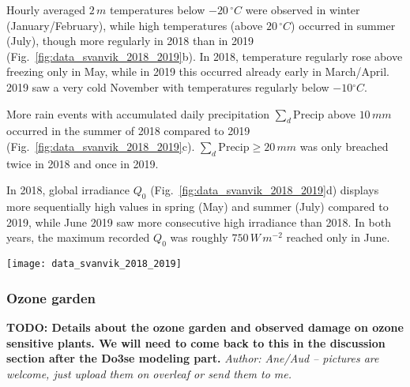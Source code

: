 \documentclass[bg, manuscript]{copernicus}
\begin{document}
Hourly averaged $2\,\unit{m}$ temperatures below $-20\,\unit{^\circ C}$ were observed in winter (January/February), while high temperatures (above $20\,\unit{^\circ C}$) occurred in summer (July), though more regularly in 2018 than in 2019 (Fig.~\ref{fig:data_svanvik_2018_2019}b). In 2018, temperature regularly rose above freezing only in May, while in 2019 this occurred already early in March/April. 2019 saw a very cold November with temperatures regularly below $-10\unit{^\circ C}$.

More rain events with accumulated daily precipitation $\sum_d \mathrm{Precip}$ above $10\,\unit{mm}$ occurred in the summer of 2018 compared to 2019 (Fig.~\ref{fig:data_svanvik_2018_2019}c). $\sum_d \mathrm{Precip} \ge 20\,\unit{mm}$ was only breached twice in 2018 and once in 2019.

In 2018, global irradiance $Q_0$ (Fig.~\ref{fig:data_svanvik_2018_2019}d) displays more sequentially high values in spring (May) and summer (July) compared to 2019, while June 2019 saw more consecutive high irradiance than 2018. In both years, the maximum recorded $Q_0$ was roughly $750\,\unit{W\,m^{-2}}$ reached only in June.

\begin{figure*}[t]
  \texttt{[image: data\_svanvik\_2018\_2019]}
  \caption{Observational data from atmospheric monitoring at Svanhovd in 2018/19. The hatched areas indicate missing ozone monitoring data. (a) Hourly averaged ozone concentration; (b) hourly averaged temperature; (c) daily accumulated precipitation; (d) hourly averaged global irradiance.}
  \label{fig:data_svanvik_2018_2019}
\end{figure*}


\subsubsection{Ozone garden}
\label{subsubsec:ozone_garden}
      {\bf TODO: Details about the ozone garden and observed damage on ozone sensitive plants. We will need to come back to this in the discussion section after the Do3se modeling part.} \emph{Author: Ane/Aud -- pictures are welcome, just upload them on overleaf or send them to me.}
\end{document}
